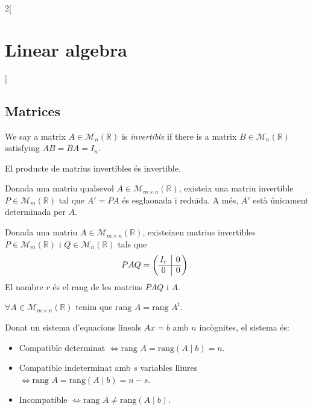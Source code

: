 \documentclass[../../../main.tex]{subfiles}
\begin{document}
\begin{multicols}{2}[\section{Linear algebra}]
\subsection{Matrices}
\begin{definition}
We say a matrix $A\in\mathcal{M}_n(\mathbb{R})$ is \textit{invertible} if there is a matrix $B\in\mathcal{M}_n(\mathbb{R})$ satisfying $AB=BA=I_n$.
\end{definition}
\begin{lemma}
El producte de matrius invertibles és invertible.
\end{lemma}
\begin{theorem}
Donada una matriu qualsevol $A\in\mathcal{M}_{m\times n}(\mathbb{R})$, existeix una matriu invertible $P\in\mathcal{M}_m(\mathbb{R})$ tal que $A'=PA$ és esglaonada i reduïda. A més, $A'$ està únicament determinada per $A$.
\end{theorem}
\begin{theorem}
Donada una matriu $A\in\mathcal{M}_{m\times n}(\mathbb{R})$, existeixen matrius invertibles $P\in\mathcal{M}_m(\mathbb{R})$ i $Q\in\mathcal{M}_n(\mathbb{R})$ tals que $$PAQ=\left(\begin{array}{@{\,} c|c @{\,}}
    I_r & 0\\
    \hline
    0 & 0
    \end{array}\right).$$ El nombre $r$ és el rang de les matrius $PAQ$ i $A$.
\end{theorem}
\begin{prop}
$\forall A\in\mathcal{M}_{m\times n}(\mathbb{R})$ tenim que $\text{rang }A=\text{rang }A^t$.
\end{prop}
\begin{theorem}
Donat un sistema d'equacions lineals $Ax=b$ amb $n$ incògnites, el sistema és:
\begin{itemize}
    \item Compatible determinat $\iff\text{rang }A=\text{rang}(A\mid b)=n$.
    \item Compatible indeterminat amb $s$ variables lliures $\iff\text{rang }A=\text{rang}(A\mid b)=n-s$.
    \item Incompatible $\iff\text{rang }A\ne\text{rang}(A\mid b)$.
\end{itemize}

\end{theorem}
\end{multicols}
\end{document}
